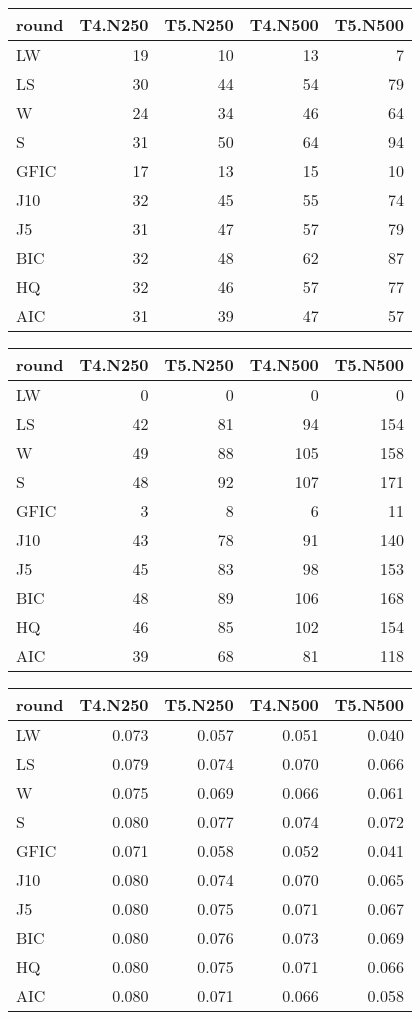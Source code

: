 %
\begin{table}[!tbp]
\begin{center}
\begin{tabular}{lrrrr}
\hline\hline
\multicolumn{1}{l}{round}&\multicolumn{1}{c}{T4.N250}&\multicolumn{1}{c}{T5.N250}&\multicolumn{1}{c}{T4.N500}&\multicolumn{1}{c}{T5.N500}\tabularnewline
\hline
LW&19&10&13& 7\tabularnewline
LS&30&44&54&79\tabularnewline
W&24&34&46&64\tabularnewline
S&31&50&64&94\tabularnewline
GFIC&17&13&15&10\tabularnewline
J10&32&45&55&74\tabularnewline
J5&31&47&57&79\tabularnewline
BIC&32&48&62&87\tabularnewline
HQ&32&46&57&77\tabularnewline
AIC&31&39&47&57\tabularnewline
\hline
\end{tabular}
\end{center}
\end{table}

%
\begin{table}[!tbp]
\begin{center}
\begin{tabular}{lrrrr}
\hline\hline
\multicolumn{1}{l}{round}&\multicolumn{1}{c}{T4.N250}&\multicolumn{1}{c}{T5.N250}&\multicolumn{1}{c}{T4.N500}&\multicolumn{1}{c}{T5.N500}\tabularnewline
\hline
LW& 0& 0&  0&  0\tabularnewline
LS&42&81& 94&154\tabularnewline
W&49&88&105&158\tabularnewline
S&48&92&107&171\tabularnewline
GFIC& 3& 8&  6& 11\tabularnewline
J10&43&78& 91&140\tabularnewline
J5&45&83& 98&153\tabularnewline
BIC&48&89&106&168\tabularnewline
HQ&46&85&102&154\tabularnewline
AIC&39&68& 81&118\tabularnewline
\hline
\end{tabular}
\end{center}
\end{table}

%
\begin{table}[!tbp]
\begin{center}
\begin{tabular}{lrrrr}
\hline\hline
\multicolumn{1}{l}{round}&\multicolumn{1}{c}{T4.N250}&\multicolumn{1}{c}{T5.N250}&\multicolumn{1}{c}{T4.N500}&\multicolumn{1}{c}{T5.N500}\tabularnewline
\hline
LW&0.073&0.057&0.051&0.040\tabularnewline
LS&0.079&0.074&0.070&0.066\tabularnewline
W&0.075&0.069&0.066&0.061\tabularnewline
S&0.080&0.077&0.074&0.072\tabularnewline
GFIC&0.071&0.058&0.052&0.041\tabularnewline
J10&0.080&0.074&0.070&0.065\tabularnewline
J5&0.080&0.075&0.071&0.067\tabularnewline
BIC&0.080&0.076&0.073&0.069\tabularnewline
HQ&0.080&0.075&0.071&0.066\tabularnewline
AIC&0.080&0.071&0.066&0.058\tabularnewline
\hline
\end{tabular}
\end{center}
\end{table}

